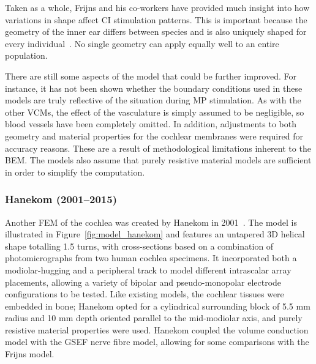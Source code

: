Taken as a whole, Frijns and his co-workers have provided much insight into how
variations in shape affect CI stimulation patterns. This is important because
the geometry of the inner ear differs between species and is also uniquely
shaped for every individual~\cite{escude2006,erixon2009}. No single geometry can
apply equally well to an entire population.

There are still some aspects of the model that could be further improved. For
instance, it has not been shown whether the boundary conditions used in these
models are truly reflective of the \invivo{} situation during MP stimulation. As
with the other VCMs, the effect of the vasculature is simply assumed to be
negligible, so blood vessels have been completely omitted. In addition,
adjustments to both geometry and material properties for the cochlear membranes
were required for accuracy reasons. These are a result of methodological
limitations inherent to the BEM. The models also assume that purely resistive
material models are sufficient in order to simplify the computation.

\subsubsection{Hanekom (2001--2015)}

Another FEM of the cochlea was created by Hanekom in 2001~\cite{hanekom2001}.
The model is illustrated in Figure~\ref{fig:model_hanekom} and features an
untapered 3D helical shape totalling 1.5 turns, with cross-sections based on a
combination of photomicrographs from two human cochlea specimens. It
incorporated both a modiolar-hugging and a peripheral track to model different
intrascalar array placements, allowing a variety of bipolar and
pseudo-monopolar electrode configurations to be tested. Like existing
models, the cochlear tissues were embedded in bone; Hanekom opted for a
cylindrical surrounding block of 5.5 mm radius and 10 mm depth oriented parallel
to the mid-modiolar axis, and purely resistive material properties were used.
Hanekom coupled the volume conduction model with the GSEF nerve fibre model,
allowing for some comparisons with the Frijns model.

